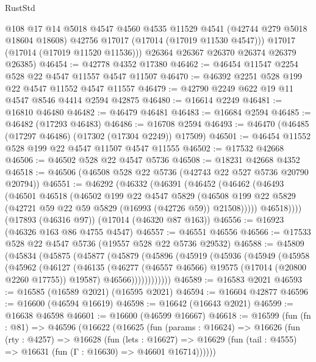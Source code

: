 \begin{lexlean}{RustStd}
\begin{coremodule}
          @108
          @17
          @14
          @5018
          @4547
          @4560
          @4535
          @11529
          @4541
          (@42744 @279 @5018 @18604 @18608)
          @42756
          @17017
          (@17014 (@17019 @11530 @4547)))
        @17017
        (@17014 (@17019 @11520 @11536)))
      @26364
      @26367
      @26370
      @26374
      @26379
      @26385)
@46454 := @42778 @4352 @17380
@46462 := @46454 @11547 @2254 @528 @22 @4547 @11557 @4547 @11507
@46470 := @46392 @2251 @528 @199 @22 @4547 @11552 @4547 @11557
@46479 := @42790 @2249 @622 @19 @11 @4547 @8546 @4414 @2594 @42875
@46480 := @16614 @2249
@46481 := @16810 @46480
@46482 := @46479 @46481
@46483 := @16684 @2594
@46485 := @46482 (@17293 @46483)
@46486 := @16708 @2594
@46493 := @46470 (@46485 (@17297 @46486) (@17302 (@17304 @2249)) @17509)
@46501 := @46454 @11552 @528 @199 @22 @4547 @11507 @4547 @11555
@46502 := @17532 @42668
@46506 := @46502 @528 @22 @4547 @5736
@46508 := @18231 @42668 @4352
@46518 := @46506 (@46508 @528 @22 @5736 (@42743 @22 @527 @5736 @20790 @20794))
@46551 := @46292
    (@46332
      (@46391
        (@46452
          (@46462
            (@46493
              (@46501
                @46518
                (@46502
                  @199
                  @22
                  @4547
                  @5829
                  (@46508 @199 @22 @5829 (@42721 @59 @22 @59 @5829 (@16993 (@42726 @59)) @21508)))))
            @46518))))
    (@17893 (@46316 @97))
    (@17014 (@46320 @87 @163))
@46556 := @16923 (@46326 @163 @86 @4755 @4547)
@46557 := @46551 @46556
@46566 := @17533 @528 @22 @4547 @5736 (@19557 @528 @22 @5736 @29532)
@46588 := @45809
    (@45834
      (@45875
        (@45877
          (@45879
            (@45896
              (@45919
                (@45936
                  (@45949
                    (@45958
                      (@45962
                        (@46127
                          (@46135
                            (@46277 (@46557 @46566) @19575 (@17014 (@20800 @2260 @17755)) @19587)
                            @46566))))))))))))
@46589 := @16583 @2021
@46593 := @16585 (@16589 @2021) (@16595 @2021)
@46594 := @16604 @42877
@46596 := @16600 (@46594 @16619)
@46598 := @16642 (@16643 @2021)
@46599 := @16638 @46598
@46601 := @16600 (@46599 @16667)
@46618 := @16599
    (fun (fn : @81) =>
    @46596
      (@16622
        (@16625
          (fun (params : @16624) =>
          @16626
            (fun (rty : @4257) =>
            @16628
              (fun (lets : @16627) =>
              @16629 (fun (tail : @4555) => @16631 (fun (Γ : @16630) => @46601 @16714))))))

\end{coremodule}
\end{lexlean}
